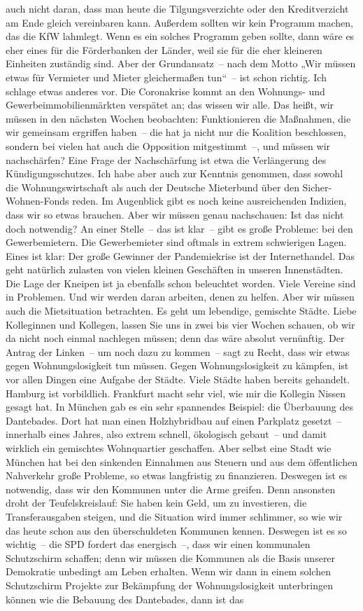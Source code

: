 \documentclass{article}
\begin{document}
auch nicht daran, dass man heute die Tilgungsverzichte oder den Kreditverzicht am Ende gleich vereinbaren kann. Außerdem sollten wir kein Programm machen, das die KfW lahmlegt. Wenn es ein solches Programm geben sollte, dann wäre es eher eines für die Förderbanken der Länder, weil sie für die eher kleineren Einheiten zuständig sind. Aber der Grundansatz – nach dem Motto „Wir müssen etwas für Vermieter und Mieter gleichermaßen tun“ – ist schon richtig. Ich schlage etwas anderes vor. Die Coronakrise kommt an den Wohnungs- und Gewerbeimmobilienmärkten verspätet an; das wissen wir alle. Das heißt, wir müssen in den nächsten Wochen beobachten: Funktionieren die Maßnahmen, die wir gemeinsam ergriffen haben – die hat ja nicht nur die Koalition beschlossen, sondern bei vielen hat auch die Opposition mitgestimmt –, und müssen wir nachschärfen? Eine Frage der Nachschärfung ist etwa die Verlängerung des Kündigungsschutzes. Ich habe aber auch zur Kenntnis genommen, dass sowohl die Wohnungswirtschaft als auch der Deutsche Mieterbund über den Sicher-Wohnen-Fonds reden. Im Augenblick gibt es noch keine ausreichenden Indizien, dass wir so etwas brauchen. Aber wir müssen genau nachschauen: Ist das nicht doch notwendig? An einer Stelle – das ist klar – gibt es große Probleme: bei den Gewerbemietern. Die Gewerbemieter sind oftmals in extrem schwierigen Lagen. Eines ist klar: Der große Gewinner der Pandemiekrise ist der Internethandel. Das geht natürlich zulasten von vielen kleinen Geschäften in unseren Innenstädten. Die Lage der Kneipen ist ja ebenfalls schon beleuchtet worden. Viele Vereine sind in Problemen. Und wir werden daran arbeiten, denen zu helfen. Aber wir müssen auch die Mietsituation betrachten. Es geht um lebendige, gemischte Städte. Liebe Kolleginnen und Kollegen, lassen Sie uns in zwei bis vier Wochen schauen, ob wir da nicht noch einmal nachlegen müssen; denn das wäre absolut vernünftig.  Der Antrag der Linken – um noch dazu zu kommen – sagt zu Recht, dass wir etwas gegen Wohnungslosigkeit tun müssen. Gegen Wohnungslosigkeit zu kämpfen, ist vor allen Dingen eine Aufgabe der Städte. Viele Städte haben bereits gehandelt. Hamburg ist vorbildlich. Frankfurt macht sehr viel, wie mir die Kollegin Nissen gesagt hat. In München gab es ein sehr spannendes Beispiel: die Überbauung des Dantebades. Dort hat man einen Holzhybridbau auf einen Parkplatz gesetzt – innerhalb eines Jahres, also extrem schnell, ökologisch gebaut – und damit wirklich ein gemischtes Wohnquartier geschaffen. Aber selbst eine Stadt wie München hat bei den sinkenden Einnahmen aus Steuern und aus dem öffentlichen Nahverkehr große Probleme, so etwas langfristig zu finanzieren. Deswegen ist es notwendig, dass wir den Kommunen unter die Arme greifen. Denn ansonsten droht der Teufelskreislauf: Sie haben kein Geld, um zu investieren, die Transferausgaben steigen, und die Situation wird immer schlimmer, so wie wir das heute schon aus den überschuldeten Kommunen kennen. Deswegen ist es so wichtig – die SPD fordert das energisch –, dass wir einen kommunalen Schutzschirm schaffen; denn wir müssen die Kommunen als die Basis unserer Demokratie unbedingt am Leben erhalten.  Wenn wir dann in einem solchen Schutzschirm Projekte zur Bekämpfung der Wohnungslosigkeit unterbringen können wie die Bebauung des Dantebades, dann ist das 
\end{document}
